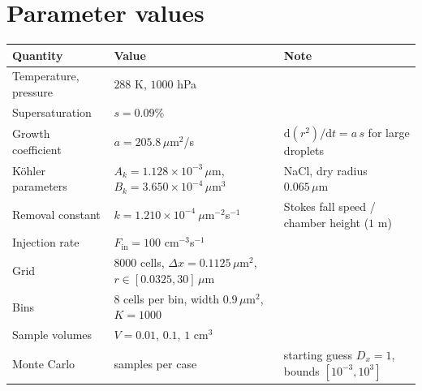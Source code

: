 \documentclass[11pt]{article}
\newcommand{\um}{\,\mu\mathrm{m}}
\newcommand{\Fin}{F_{\mathrm{in}}}
\newcommand{\dd}{\mathrm{d}}
\begin{document}
\section{Parameter values}\label{app:params}
\begin{center}\small
\begin{tabular}{@{}>{\raggedright\arraybackslash}p{4.6cm}>{\raggedright\arraybackslash}p{4.8cm}>{\raggedright\arraybackslash}p{5.6cm}@{}}
\toprule
Quantity & Value & Note\\\midrule
Temperature, pressure & $288$ K, $1000$ hPa & \\
Supersaturation & $s = 0.09\%$ & \\
Growth coefficient & $a = 205.8\um^2$/s & $\dd(r^2)/\dd t = a\,s$ for large droplets\\
Köhler parameters & $A_k = 1.128\times10^{-3}\um$, $B_k = 3.650\times10^{-4}\um^3$ & NaCl, dry radius $0.065\um$\\
Removal constant & $k = 1.210\times10^{-4}\ \mu$m$^{-2}$s$^{-1}$ & Stokes fall speed / chamber height ($1$ m)\\
Injection rate & $\Fin = 100$ cm$^{-3}$s$^{-1}$ & \\
Grid & $8000$ cells, $\Delta x = 0.1125\um^2$, $r\in[0.0325, 30]\um$ & \\
Bins & $8$ cells per bin, width $0.9\um^2$, $K = 1000$ & \\
Sample volumes & $V = 0.01$, $0.1$, $1$ cm$^3$ & \\
Monte Carlo & 200 samples per case & starting guess $D_x = 1$, bounds $[10^{-3},10^3]$\\\bottomrule
\end{tabular}
\end{center}
\end{document}
